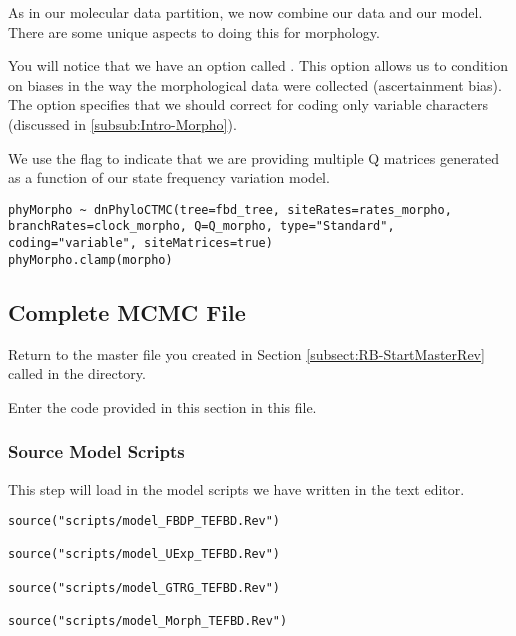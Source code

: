 As in our molecular data partition, we now combine our data and our model. There are some unique aspects to doing this for morphology. \par
You will notice that we have an option called . This option allows us to condition on biases in the way the morphological data were collected (ascertainment bias).
The option  specifies that we should correct for coding only variable characters (discussed in \ref{subsub:Intro-Morpho}). \par

We use the flag  to indicate that we are providing multiple Q matrices generated as a function of our state frequency variation model. \par


{\tt \begin{snugshade*}
\begin{lstlisting}
phyMorpho ~ dnPhyloCTMC(tree=fbd_tree, siteRates=rates_morpho, branchRates=clock_morpho, Q=Q_morpho, type="Standard", coding="variable", siteMatrices=true)
phyMorpho.clamp(morpho)
\end{lstlisting}
\end{snugshade*}}


\bigskip

\subsection{Complete MCMC File}\label{subsect:RB-CompleteMCMC}

{\begin{framed}
Return to the master \Rev file you created in Section \ref{subsect:RB-StartMasterRev} called {\textcolor{red}{}} in the  directory.

Enter the \Rev code provided in this section in this file.
\end{framed}}

\medskip
\subsubsection{Source Model Scripts}\label{subsub:RB-SourceMods}

This step will load in the model scripts we have written in the text editor.

{\tt \begin{snugshade*}
\begin{lstlisting}
source("scripts/model_FBDP_TEFBD.Rev")

source("scripts/model_UExp_TEFBD.Rev")

source("scripts/model_GTRG_TEFBD.Rev")

source("scripts/model_Morph_TEFBD.Rev")
\end{lstlisting}
\end{snugshade*}}



